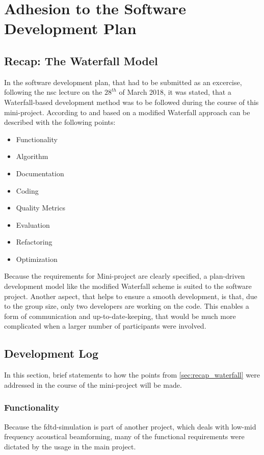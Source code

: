 \chapter{Adhesion to the Software Development Plan}\label{ch:sdp}
\section{Recap: The Waterfall Model}\label{sec:recap_waterfall}
In the software development plan, that had to be submitted as an excercise, following the \gls{nsc} lecture on the $28^{th}$ of March 2018, it was stated, that a Waterfall-based development method was to be followed during the course of this mini-project.
According to \citep[p. 141]{preview} and based on \citep{royce70} a modified Waterfall approach can be described with the following points:\\
\begin{itemize}
\item Functionality
\item Algorithm
\item Documentation
\item Coding
\item Quality Metrics
\item Evaluation
\item Refactoring
\item Optimization
\end{itemize}
Because the requirements for Mini-project are clearly specified, a plan-driven development model like the modified Waterfall scheme is suited to the software project. Another aspect, that helps to ensure a smooth development, is that, due to the group size, only two developers are working on the code. This enables a form of communication and up-to-date-keeping, that would be much more complicated when a larger number of participants were involved.
\section{Development Log}\label{sec:dev_log}
In this section, brief statements to how the points from \autoref{sec:recap_waterfall} were addressed in the course of the mini-project will be made.
\subsection{Functionality}\label{ssec:functionality}
Because the \gls{fdtd}-simulation is part of another project, which deals with low-mid frequency acoustical beamforming, many of the functional requirements were dictated by the usage in the main project.